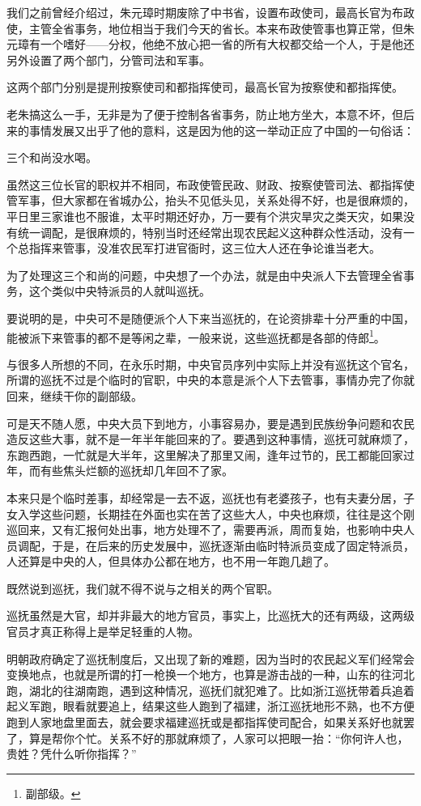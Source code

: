 \begin{multicols}{\theparacolNo}
我们之前曾经介绍过，朱元璋时期废除了中书省，设置布政使司，最高长官为布政使，主管全省事务，地位相当于我们今天的省长。本来布政使管事也算正常，但朱元璋有一个嗜好——分权，他绝不放心把一省的所有大权都交给一个人，于是他还另外设置了两个部门，分管司法和军事。

这两个部门分别是提刑按察使司和都指挥使司，最高长官为按察使和都指挥使。

老朱搞这么一手，无非是为了便于控制各省事务，防止地方坐大，本意不坏，但后来的事情发展又出乎了他的意料，这是因为他的这一举动正应了中国的一句俗话：

三个和尚没水喝。

虽然这三位长官的职权并不相同，布政使管民政、财政、按察使管司法、都指挥使管军事，但大家都在省城办公，抬头不见低头见，关系处得不好，也是很麻烦的，平日里三家谁也不服谁，太平时期还好办，万一要有个洪灾旱灾之类天灾，如果没有统一调配，是很麻烦的，特别当时还经常出现农民起义这种群众性活动，没有一个总指挥来管事，没准农民军打进官衙时，这三位大人还在争论谁当老大。

为了处理这三个和尚的问题，中央想了一个办法，就是由中央派人下去管理全省事务，这个类似中央特派员的人就叫巡抚。

要说明的是，中央可不是随便派个人下来当巡抚的，在论资排辈十分严重的中国，能被派下来管事的都不是等闲之辈，一般来说，这些巡抚都是各部的侍郎\footnote{副部级。}。

与很多人所想的不同，在永乐时期，中央官员序列中实际上并没有巡抚这个官名，所谓的巡抚不过是个临时的官职，中央的本意是派个人下去管事，事情办完了你就回来，继续干你的副部级。

可是天不随人愿，中央大员下到地方，小事容易办，要是遇到民族纷争问题和农民造反这些大事，就不是一年半年能回来的了。要遇到这种事情，巡抚可就麻烦了，东跑西跑，一忙就是大半年，这里解决了那里又闹，逢年过节的，民工都能回家过年，而有些焦头烂额的巡抚却几年回不了家。

本来只是个临时差事，却经常是一去不返，巡抚也有老婆孩子，也有夫妻分居，子女入学这些问题，长期挂在外面也实在苦了这些大人，中央也麻烦，往往是这个刚巡回来，又有汇报何处出事，地方处理不了，需要再派，周而复始，也影响中央人员调配，于是，在后来的历史发展中，巡抚逐渐由临时特派员变成了固定特派员，人还算是中央的人，但具体办公都在地方，也不用一年跑几趟了。

既然说到巡抚，我们就不得不说与之相关的两个官职。

巡抚虽然是大官，却并非最大的地方官员，事实上，比巡抚大的还有两级，这两级官员才真正称得上是举足轻重的人物。

明朝政府确定了巡抚制度后，又出现了新的难题，因为当时的农民起义军们经常会变换地点，也就是所谓的打一枪换一个地方，也算是游击战的一种，山东的往河北跑，湖北的往湖南跑，遇到这种情况，巡抚们就犯难了。比如浙江巡抚带着兵追着起义军跑，眼看就要追上，结果这些人跑到了福建，浙江巡抚地形不熟，也不方便跑到人家地盘里面去，就会要求福建巡抚或是都指挥使司配合，如果关系好也就罢了，算是帮你个忙。关系不好的那就麻烦了，人家可以把眼一抬：“你何许人也，贵姓？凭什么听你指挥？”


\end{multicols}
